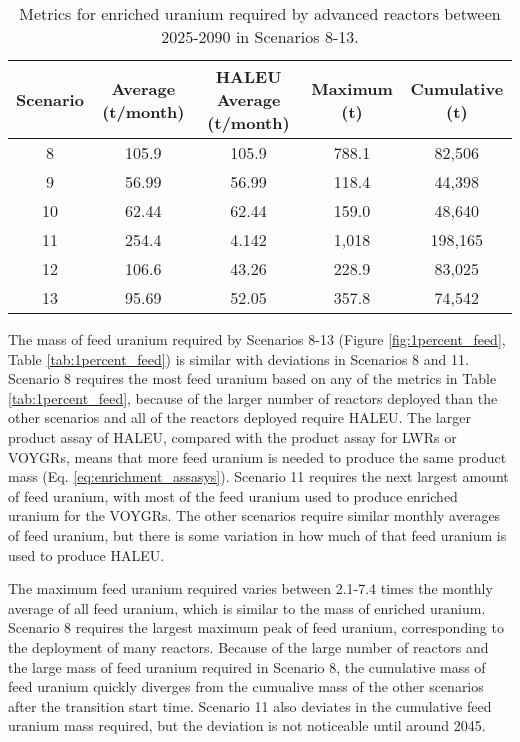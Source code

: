 \begin{table}
    \centering 
    \caption{Metrics for enriched uranium required by advanced reactors 
    between 2025-2090 in Scenarios 8-13.}
    \label{tab:1percent_uranium}
    \begin{tabular}{c c c c c}
        \hline
        Scenario & Average (t/month) & \gls{HALEU} Average  
        (t/month) & Maximum (t) & Cumulative (t)\\\hline
        8 & 105.9 & 105.9 & 788.1 & 82,506\\
        9 & 56.99 & 56.99 & 118.4 & 44,398\\
        10 & 62.44 & 62.44 & 159.0 & 48,640\\
        11 & 254.4 & 4.142 & 1,018 & 198,165\\
        12 & 106.6 & 43.26 & 228.9 & 83,025\\
        13 & 95.69 & 52.05 & 357.8 & 74,542\\
        \hline
    \end{tabular}
\end{table}

The mass of feed uranium required by Scenarios 8-13 (Figure \ref{fig:1percent_feed},
Table \ref{tab:1percent_feed}) is similar with deviations in
Scenarios 8 and 11. Scenario 8 requires the 
most feed uranium based on any of the metrics in Table \ref{tab:1percent_feed},
because of the larger number of 
reactors deployed than the other scenarios and all of the reactors deployed 
require \gls{HALEU}. The larger product assay of \gls{HALEU}, compared with 
the product assay for \glspl{LWR} or VOYGRs, means that more 
feed uranium is needed to produce the same product mass (Eq. 
\ref{eq:enrichment_assasys}). Scenario 11 requires the next largest amount 
of 
feed uranium, with most of the feed uranium used to produce enriched 
uranium for the VOYGRs. The other scenarios require similar monthly 
averages of feed uranium, but there is some variation in how much of 
that feed uranium is used to produce \gls{HALEU}. 

The maximum feed uranium required varies between 2.1-7.4 times the monthly 
average of all feed uranium, which is similar to the 
mass of enriched uranium. Scenario 8 requires the largest maximum peak of 
feed uranium, corresponding to the deployment of many reactors. Because of 
the large number of reactors and the large mass of feed uranium required 
in Scenario 8, the cumulative mass of feed uranium quickly diverges from 
the cumualive mass of the other scenarios after the transition start time. 
Scenario 11 also deviates in the cumulative feed uranium 
mass required, but the deviation is not noticeable until around 
2045. 


